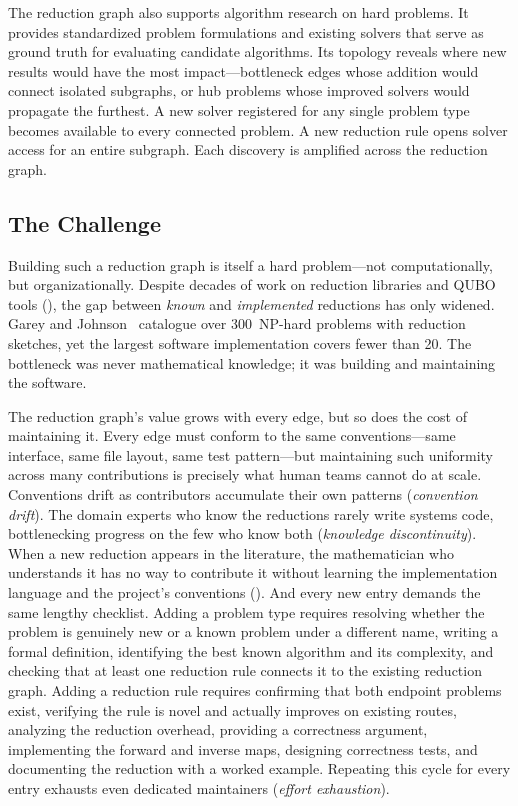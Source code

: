 \documentclass[conference]{IEEEtran}
\begin{document}
The reduction graph also supports algorithm research on hard problems.
It provides standardized problem formulations and existing solvers that serve as ground truth for evaluating candidate algorithms.
Its topology reveals where new results would have the most impact---bottleneck edges whose addition would connect isolated subgraphs, or hub problems whose improved solvers would propagate the furthest.
A new solver registered for any single problem type becomes available to every connected problem.
A new reduction rule opens solver access for an entire subgraph.
Each discovery is amplified across the reduction graph.

\subsection{The Challenge}

Building such a reduction graph is itself a hard problem---not computationally, but organizationally.
Despite decades of work on reduction libraries and QUBO tools (), the gap between \emph{known} and \emph{implemented} reductions has only widened.
Garey and Johnson~\cite{garey1979} catalogue over 300~NP-hard problems with reduction sketches, yet the largest software implementation covers fewer than 20.
The bottleneck was never mathematical knowledge; it was building and maintaining the software.

The reduction graph's value grows with every edge, but so does the cost of maintaining it.
Every edge must conform to the same conventions---same interface, same file layout, same test pattern---but maintaining such uniformity across many contributions is precisely what human teams cannot do at scale.
Conventions drift as contributors accumulate their own patterns (\emph{convention drift}).
The domain experts who know the reductions rarely write systems code, bottlenecking progress on the few who know both (\emph{knowledge discontinuity}).
When a new reduction appears in the literature, the mathematician who understands it has no way to contribute it without learning the implementation language and the project's conventions ().
And every new entry demands the same lengthy checklist.
Adding a problem type requires resolving whether the problem is genuinely new or a known problem under a different name, writing a formal definition, identifying the best known algorithm and its complexity, and checking that at least one reduction rule connects it to the existing reduction graph.
Adding a reduction rule requires confirming that both endpoint problems exist, verifying the rule is novel and actually improves on existing routes, analyzing the reduction overhead, providing a correctness argument, implementing the forward and inverse maps, designing correctness tests, and documenting the reduction with a worked example.
Repeating this cycle for every entry exhausts even dedicated maintainers (\emph{effort exhaustion}).
\end{document}
